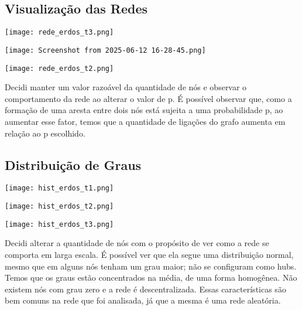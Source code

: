 \documentclass[a4paper]{article}
\begin{document}
\subsection*{Visualização das Redes}

\begin{center}
    \texttt{[image: rede\_erdos\_t3.png]}
\end{center}

\begin{center}
    \texttt{[image: Screenshot from 2025-06-12 16-28-45.png]}
\end{center}

\begin{center}
    \texttt{[image: rede\_erdos\_t2.png]}
\end{center}

Decidi manter um valor razoável da quantidade de nós e observar o comportamento da rede ao alterar o valor de p. É possível observar que, como a formação de uma aresta entre dois nós está sujeita a uma probabilidade p, ao aumentar esse fator, temos que a quantidade de ligações do grafo aumenta em relação ao p escolhido.

\subsection*{Distribuição de Graus}

\begin{center}
    \texttt{[image: hist\_erdos\_t1.png]}
\end{center}

\begin{center}
    \texttt{[image: hist\_erdos\_t2.png]}
\end{center}

\begin{center}
    \texttt{[image: hist\_erdos\_t3.png]}
\end{center}

Decidi alterar a quantidade de nós com o propósito de ver como a rede se comporta em larga escala. É possível ver que ela segue uma distribuição normal, mesmo que em alguns nós tenham um grau maior; não se configuram como hubs. Temos que os graus estão concentrados na média, de uma forma homogênea. Não existem nós com grau zero e a rede é descentralizada. Essas características são bem comuns na rede que foi analisada, já que a mesma é uma rede aleatória.
\end{document}
